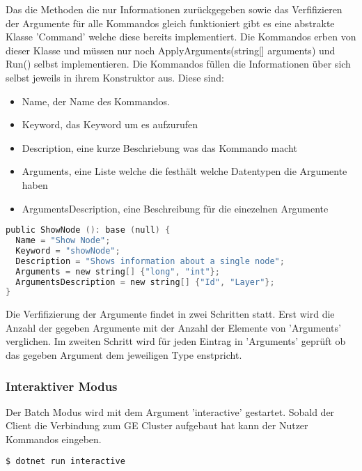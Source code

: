 Das die Methoden die nur Informationen zurückgegeben sowie das Verfifizieren der Argumente für alle Kommandos gleich funktioniert gibt es eine abstrakte Klasse
'Command' welche diese bereits implementiert. Die Kommandos erben von dieser Klasse und müssen nur noch ApplyArguments(string[] arguments) und Run() selbst implementieren.
Die Kommandos füllen die Informationen über sich selbst jeweils in ihrem Konstruktor aus. Diese sind:

\begin{itemize}
  \item Name, der Name des Kommandos.
  \item Keyword, das Keyword um es aufzurufen
  \item Description, eine kurze Beschriebung was das Kommando macht
  \item Arguments, eine Liste welche die festhält welche Datentypen die Argumente haben
  \item ArgumentsDescription, eine Beschreibung für die einezelnen Argumente
\end{itemize}

\begin{lstlisting}[language=c]
public ShowNode (): base (null) {
  Name = "Show Node";
  Keyword = "showNode";
  Description = "Shows information about a single node";
  Arguments = new string[] {"long", "int"};
  ArgumentsDescription = new string[] {"Id", "Layer"};
}
\end{lstlisting}


Die Verfifizierung der Argumente findet in zwei Schritten statt. Erst wird die Anzahl der gegeben Argumente mit der Anzahl der Elemente von 'Arguments' verglichen.
Im zweiten Schritt wird für jeden Eintrag in 'Arguments' geprüft ob das gegeben Argument dem jeweiligen Type enstpricht.





\subsubsection{Interaktiver Modus}

Der Batch Modus wird mit dem Argument 'interactive' gestartet. Sobald der Client die Verbindung zum GE Cluster aufgebaut hat kann der Nutzer Kommandos eingeben.


\begin{lstlisting}[language=bash]
  $ dotnet run interactive
\end{lstlisting}



